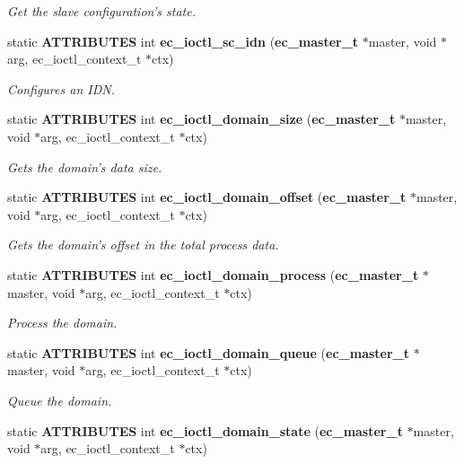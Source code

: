 \begin{DoxyCompactItemize}
\begin{DoxyCompactList}\small\item\em Get the slave configuration's state. \end{DoxyCompactList}\item 
static {\bf A\-T\-T\-R\-I\-B\-U\-T\-E\-S} int {\bf ec\-\_\-ioctl\-\_\-sc\-\_\-idn} ({\bf ec\-\_\-master\-\_\-t} $\ast$master, void $\ast$arg, ec\-\_\-ioctl\-\_\-context\-\_\-t $\ast$ctx)
\begin{DoxyCompactList}\small\item\em Configures an I\-D\-N. \end{DoxyCompactList}\item 
static {\bf A\-T\-T\-R\-I\-B\-U\-T\-E\-S} int {\bf ec\-\_\-ioctl\-\_\-domain\-\_\-size} ({\bf ec\-\_\-master\-\_\-t} $\ast$master, void $\ast$arg, ec\-\_\-ioctl\-\_\-context\-\_\-t $\ast$ctx)
\begin{DoxyCompactList}\small\item\em Gets the domain's data size. \end{DoxyCompactList}\item 
static {\bf A\-T\-T\-R\-I\-B\-U\-T\-E\-S} int {\bf ec\-\_\-ioctl\-\_\-domain\-\_\-offset} ({\bf ec\-\_\-master\-\_\-t} $\ast$master, void $\ast$arg, ec\-\_\-ioctl\-\_\-context\-\_\-t $\ast$ctx)
\begin{DoxyCompactList}\small\item\em Gets the domain's offset in the total process data. \end{DoxyCompactList}\item 
static {\bf A\-T\-T\-R\-I\-B\-U\-T\-E\-S} int {\bf ec\-\_\-ioctl\-\_\-domain\-\_\-process} ({\bf ec\-\_\-master\-\_\-t} $\ast$master, void $\ast$arg, ec\-\_\-ioctl\-\_\-context\-\_\-t $\ast$ctx)
\begin{DoxyCompactList}\small\item\em Process the domain. \end{DoxyCompactList}\item 
static {\bf A\-T\-T\-R\-I\-B\-U\-T\-E\-S} int {\bf ec\-\_\-ioctl\-\_\-domain\-\_\-queue} ({\bf ec\-\_\-master\-\_\-t} $\ast$master, void $\ast$arg, ec\-\_\-ioctl\-\_\-context\-\_\-t $\ast$ctx)
\begin{DoxyCompactList}\small\item\em Queue the domain. \end{DoxyCompactList}\item 
static {\bf A\-T\-T\-R\-I\-B\-U\-T\-E\-S} int {\bf ec\-\_\-ioctl\-\_\-domain\-\_\-state} ({\bf ec\-\_\-master\-\_\-t} $\ast$master, void $\ast$arg, ec\-\_\-ioctl\-\_\-context\-\_\-t $\ast$ctx)

\end{DoxyCompactItemize}

